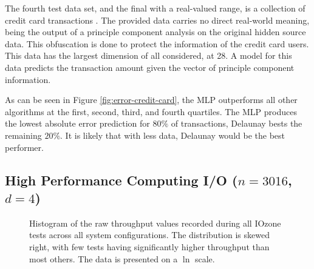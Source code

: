 The fourth test data set, and the final with a real-valued range, is a
collection of credit card transactions
\cite{pozzolo2015calibrating}. The provided data carries no direct
real-world meaning, being the output of a principle component analysis
on the original hidden source data. This obfuscation is done to
protect the information of the credit card users. This data has the
largest dimension of all considered, at 28. A model for this data
predicts the transaction amount given the vector of principle
component information.

As can be seen in Figure \ref{fig:error-credit-card}, the MLP
outperforms all other algorithms at the first, second, third, and
fourth quartiles. The MLP produces the lowest absolute error
prediction for $80\%$ of transactions, Delaunay bests the remaining
$20\%$. It is likely that with less data, Delaunay would be the best
performer.


\subsection{High Performance Computing I/O ($n = 3016$, $d = 4$)}

\begin{figure}
  \centering
  \caption{Histogram of the raw throughput values recorded during all
    IOzone tests across all system configurations. The distribution is
    skewed right, with few tests having significantly higher
    throughput than most others. The data is presented on a $\ln$
    scale.}
  \label{fig:hist-throughput}
\end{figure}

